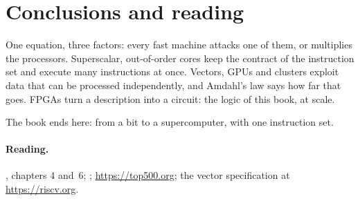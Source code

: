 \section{Conclusions and reading}

One equation, three factors: every fast machine attacks one of them, or
multiplies the processors. Superscalar, out-of-order cores keep the contract
of the instruction set and execute many instructions at once. Vectors, GPUs
and clusters exploit data that can be processed independently, and Amdahl's
law says how far that goes. FPGAs turn a description into a circuit: the
logic of this book, at scale.

The book ends here: from a bit to a supercomputer, with one instruction set.

\paragraph{Reading.} \citet{patterson2020}, chapters 4 and~6;
\citet{hennessy2019}; \url{https://top500.org}; the \riscv vector
specification at \url{https://riscv.org}.
